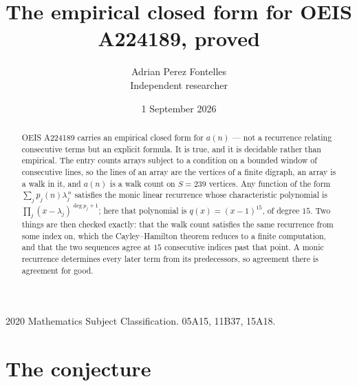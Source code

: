 \documentclass[11pt,a4paper]{article}
\title{The empirical closed form for OEIS A224189, proved}
\author{Adrian Perez Fontelles\\ \small Independent researcher}
\date{1 September 2026}
\theoremstyle{plain}
\theoremstyle{definition}
\begin{document}
\maketitle

\begin{abstract}
OEIS A224189 carries an empirical closed form for $a(n)$ --- not a recurrence relating
consecutive terms but an explicit formula. It is true, and it is decidable rather than
empirical. The entry counts arrays subject to a condition on a bounded window of consecutive lines, so the lines of an array are the
vertices of a finite digraph, an array is a walk in it, and $a(n)$ is a walk count on
$S=239$ vertices. Any function of the form $\sum_j p_j(n)\lambda_j^{\,n}$ satisfies the
monic linear recurrence whose characteristic polynomial is
$\prod_j(x-\lambda_j)^{\deg p_j+1}$; here that polynomial is $q(x)=(x-1)^{15}$, of degree
$15$. Two things are then checked exactly: that the walk count satisfies the same
recurrence from some index on, which the Cayley--Hamilton theorem reduces to a finite
computation, and that the two sequences agree at $15$ consecutive indices past that
point. A monic recurrence determines every later term from its predecessors, so agreement
there is agreement for good.
\end{abstract}

\noindent\small 2020 Mathematics Subject Classification. 05A15, 11B37, 15A18.\normalsize

\section{The conjecture}
\end{document}

